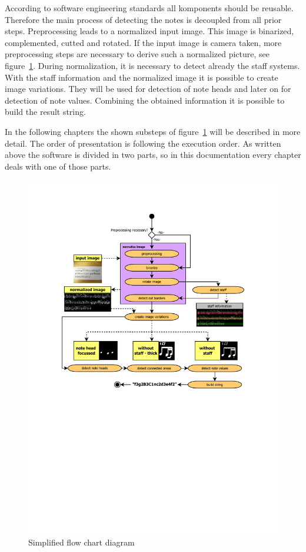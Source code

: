 According to software engineering standards all komponents should be reusable. Therefore the main process of detecting the notes is decoupled from all prior steps. Preprocessing leads to a normalized input image. This image is binarized, complemented, cutted and rotated. If the input image is camera taken, more preprocessing steps are necessary to derive such a normalized picture, see figure~\ref{fig:flow}. During normalization, it is necessary to detect already the staff systems. With the staff information and the normalized image it is possible to create image variations. They will be used for detection of note heads and later on for detection of note values. Combining the obtained information it is possible to build the result string. 

In the following chapters the shown substeps of figure~\ref{fig:flow} will be described in more detail. The order of presentation is following the execution order. As written above the software is divided in two parts, so in this documentation every chapter deals with one of those parts.



\begin{figure}[htbp]
    \centering
		\includegraphics[width=\textwidth,trim=60  300 70 60, clip=true]{Diagram1.pdf}
		\caption {Simplified flow chart diagram \label{fig:flow}}
\end{figure}



